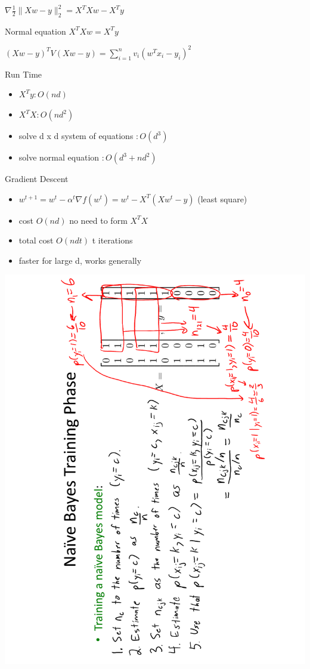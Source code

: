 \documentclass[1pt,letter]{article}
\def\half{\frac 1 2}
\def\items#1{\begin{itemize}[noitemsep,topsep=0pt,parsep=0pt,partopsep=0pt]#1\end{itemize}}
\begin{document}
\begin{minipage}{0.55\textwidth}
{{                \item $\nabla \half\|Xw-y\|^2_2 = X^T Xw -X^Ty$ 
                \item Normal equation $X^T Xw =X^Ty$
                \item $(Xw-y)^T V (Xw-y) = \sum_{i=1}^n v_i (w^T x_i -y_i)^2$
            }
            Run Time
            \items{
                \item $X^Ty: O(nd)$
                \item $X^TX: O(nd^2)$
                \item solve d x d system of equations $: O(d^3)$
                \item solve normal equation $: O(d^3 + nd^2)$
            }
            Gradient Descent
            \items{
                \item $w^{t+1} = w^t - \alpha^t \nabla f(w^t) = w^t -  X^T(Xw^t-y)$ (least square)
                \item cost $O(nd)$ no need to form $X^TX$
                \item total cost $O(ndt)$ t iterations 
                \item faster for large d, works generally
            }
        \item
        \item
    }
    
\end{minipage}

\newpage 
    \includegraphics[scale=0.4]{NaiveBayes.pdf}
\end{document}
